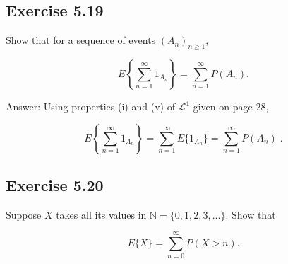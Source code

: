 \documentclass{article}
\begin{document}
\subsection*{Exercise 5.19}
Show that for a sequence of events $(A_n)_{n\geq 1}$, 

$$
E\left\lbrace \sum_{n=1}^\infty 1_{A_n} \right\rbrace
= \sum_{n=1}^\infty P(A_n) .
$$

Answer: Using properties (i) and (v) of $\mathcal{L}^1$ given on page 28,

$$
E\left\lbrace \sum_{n=1}^\infty 1_{A_n} \right\rbrace
= \sum_{n=1}^\infty E\{1_{A_n} \}
= \sum_{n=1}^\infty P(A_n) \;.
$$

\subsection*{Exercise 5.20}

Suppose $X$ takes all its values in $\mathbb{N} = \{0, 1, 2, 3,...\}$. Show that

$$
E\{X\} = \sum_{n=0}^\infty P(X > n).
$$
\end{document}
